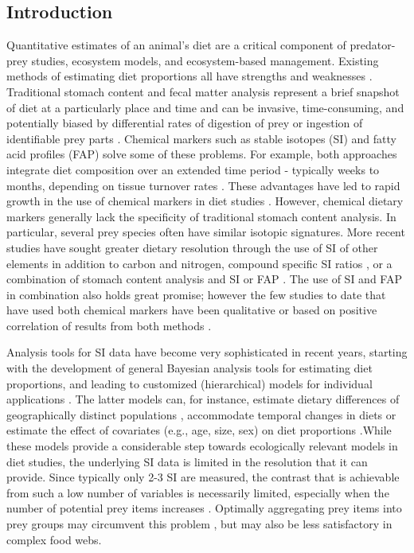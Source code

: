 \documentclass[12pt]{article}%
\begin{document}
\begin{spacing}{1.9}
\begin{flushleft}
\section{Introduction}
Quantitative estimates of an animal’s diet are a critical component of
predator-prey studies, ecosystem models, and ecosystem-based
management. Existing methods of estimating diet proportions all have
strengths and weaknesses \citep{bowen_methods_2012}. Traditional
stomach content and fecal matter analysis represent a brief snapshot
of diet at a particularly place and time and can be invasive,
time-consuming, and potentially biased by differential rates of
digestion of prey or ingestion of identifiable prey parts
\citep{bowen_methods_2012}. Chemical markers such as stable isotopes
(SI) and fatty acid profiles (FAP) solve some of these problems.  For
example, both approaches integrate diet composition over an extended
time period -  typically weeks to months, depending on tissue turnover
rates  \citep{tucker_convergence_2008}. These advantages have led to rapid
growth in the use of chemical markers in diet studies
 \citep{elsdon_unraveling_2010,williams_using_2010,kelly_fatty_2011,
bowen_methods_2012}. However, chemical dietary markers generally lack
the specificity of traditional stomach content analysis. In
particular, several prey species often have similar isotopic signatures. More
recent studies have sought greater dietary resolution through the use
of SI of other elements in addition to carbon and
nitrogen\citep{belicka_stable_2012}, compound specific SI ratios
\citep{budge_tracing_2008,jack_individual_2011}, or a combination of stomach
content analysis and SI or FAP \citep{pethybridge_seasonal_2012}. The
use of SI and FAP in combination also holds great promise; however the
few studies to date that have used both chemical markers have been
qualitative \citep{guest_trophic_2009} or based on positive correlation
of results from both methods \citep{tucker_convergence_2008}.

Analysis tools for SI data have become very sophisticated in recent
years, starting with the development of general Bayesian analysis
tools for estimating diet proportions, and leading to customized
(hierarchical) models for individual applications \citep{moore_incorporating_2008,hopkins_estimating_2012,parnell_bayesian_2012}. The latter models
can, for instance, estimate dietary differences of geographically
distinct populations \citep{semmens_quantifying_2009}, accommodate temporal
changes in diets or estimate the effect of covariates (e.g., age,
size, sex) on diet proportions \citep{parnell_bayesian_2012}.While these
models provide a considerable step towards ecologically relevant
models in diet studies, the underlying SI data is limited in the
resolution that it can provide. Since typically only 2-3 SI are
measured, the contrast that is achievable from such a low number of
variables is necessarily limited, especially when the number of
potential prey items increases \citep{phillips_source_2003,ward_quantitative_2011}. Optimally aggregating prey items into prey groups may
circumvent this problem \citep{ward_quantitative_2011}, but may also be less
satisfactory in complex food webs.


\end{flushleft}
\end{spacing}
\end{document}
